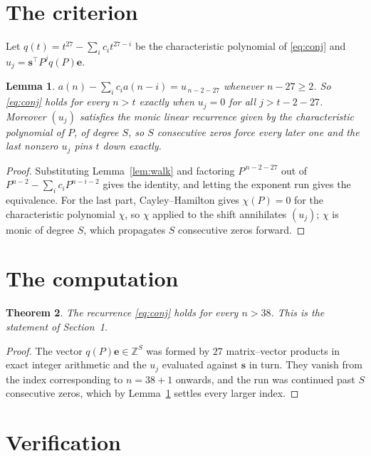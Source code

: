 \documentclass[11pt,a4paper]{article}
\theoremstyle{plain}
\newtheorem{theorem}{Theorem}
\newtheorem{lemma}[theorem]{Lemma}
\theoremstyle{definition}
\begin{document}
\section{The criterion}

Let $q(t)=t^{27}-\sum_i c_i t^{27-i}$ be the characteristic polynomial of
\eqref{eq:conj} and $u_j=\mathbf{s}^{\!\top}P^{j}q(P)\mathbf{e}$.

\begin{lemma}\label{lem:crit}
$a(n)-\sum_i c_i a(n-i)=u_{\,n-2-27}$ whenever $n-27\ge2$. So \eqref{eq:conj}
holds for every $n>t$ exactly when $u_j=0$ for all $j>t-2-27$. Moreover $(u_j)$
satisfies the monic linear recurrence given by the characteristic polynomial of $P$, of
degree $S$, so $S$ consecutive zeros force every later one and the last nonzero $u_j$ pins
$t$ down exactly.
\end{lemma}

\begin{proof}
Substituting Lemma~\ref{lem:walk} and factoring $P^{\,n-2-27}$ out of
$P^{n-2}-\sum_i c_i P^{n-i-2}$ gives the identity, and letting the exponent run gives the
equivalence. For the last part, Cayley--Hamilton gives $\chi(P)=0$ for the characteristic
polynomial $\chi$, so $\chi$ applied to the shift annihilates $(u_j)$; $\chi$ is monic of
degree $S$, which propagates $S$ consecutive zeros forward.
\end{proof}

\section{The computation}

\begin{theorem}
The recurrence \eqref{eq:conj} holds for every $n>38$. This is the statement of
Section~1.
\end{theorem}

\begin{proof}
The vector $q(P)\mathbf{e}\in\mathbb{Z}^{S}$ was formed by $27$ matrix--vector
products in exact integer arithmetic and the $u_j$ evaluated against $\mathbf{s}$ in turn.
They vanish from the index corresponding to $n=38+1$ onwards, and the run was continued
past $S$ consecutive zeros, which by Lemma~\ref{lem:crit} settles every larger index.
\end{proof}

\section{Verification}
\end{document}
